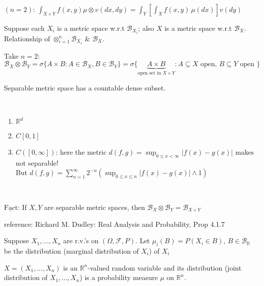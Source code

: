 \documentclass[11pt]{article}
\begin{document}
\begin{theorem}
    \,

    $(n=2)$: $\int_{X \times Y} f(x,y) \mu \otimes v (dx,dy) = \int_{Y}[\int_{X}f(x,y)\, \mu(dx)]v(dy)$
\end{theorem}

Suppose each $X_{i}$ is a metric space w.r.t $\mathcal{B}_{X_{i}}$; also $X$ is a 
metric space w.r.t $\mathcal{B}_{X}$. Relationship of $\otimes_{i=1}^{n}\mathcal{B}_{X_{i}}$ $\&$ $\mathcal{B}_{X}$.

Take $n=2$: $\mathcal{B}_{X} \otimes \mathcal{B}_{Y} = \sigma \{ A \times B: A \in \mathcal{B}_{X},
B \in \mathcal{B}_{Y} \} = \sigma\{\underbrace{A \times B}_{\text{open set in } X \times Y}:A
 \subseteq X \text{ open, }B \subseteq Y \text{ open } \}$ 

\begin{definition}
    Separable metric space has a countable dense subset.
\end{definition}

\begin{example}
    \,

    \begin{enumerate}
        \item $\mathbb{R}^{d}$
        \item $C[0,1]$
        \item $C([0,\infty])$: here the metric $d(f,g) = \sup_{0 \le x < \infty}|f(x) - g(x)|$ makes not separable!\\
        But $d(f,g) = \sum_{n=1}^{\infty}2^{-n}(\sup_{0\le x\le n}|f(x) - g(x)| \land 1)$
    \end{enumerate}
\end{example}

\begin{theorem}
    \,

    $\underline{\text{Fact}}$: If $X,Y$ are separable metric spaces, then $\mathcal{B}_{X} \otimes \mathcal{B}_{Y}
    = \mathcal{B}_{X\times Y}$
\end{theorem}

\begin{remark}
    reference: Richard M. Dudley: Real Analysis and Probability, Prop 4.1.7
\end{remark}


\begin{definition}
    Suppose $X_1, \ldots ,X_n$ are r.v.'s on $(\Omega, \mathcal{F}, P)$. Let $\mu_i(B) = P(X_{i} \in B),
\, B \in \mathcal{B}_{\mathbb{R}}$ be the distribution (marginal distribution of $X_{i}$) of $X_{i}$

$ X = (X_1, \ldots ,X_n)$ is an $\mathbb{R}^{n}$-valued random variable and its distribution (joint distribution
of $X_1, \ldots ,X_n$)
is a probability measure $\mu$
on $\mathbb{R}^{n}$.
\end{definition}
\end{document}
